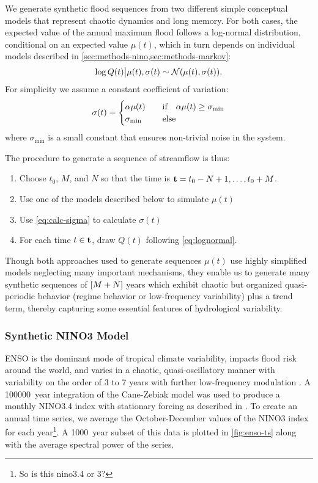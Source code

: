 \documentclass[12pt]{article}
\begin{document}
We generate synthetic flood sequences from two different simple conceptual models that represent chaotic dynamics and long memory.
For both cases, the expected value of the annual maximum flood follows a log-normal distribution, conditional on an expected value $\mu(t)$, which in turn depends on individual models described in \cref{sec:methods-nino,sec:methods-markov}:
\begin{equation} \label{eq:lognormal}
  \log Q(t) \big| \mu(t),\sigma(t) \sim \mathcal{N} \qty(\mu(t), \sigma(t)).
\end{equation}
For simplicity we assume a constant coefficient of variation:
\begin{equation}\label{eq:calc-sigma}
  \sigma(t) = 
  \begin{cases} 
    \alpha \mu(t) & \qqtext{if} \alpha \mu(t) \geq \sigma_\text{min} \\ 
    \sigma_\text{min} & \qqtext{else}
  \end{cases}
\end{equation}
where $\sigma_\text{min}$ is a small constant that ensures non-trivial noise in the system.

The procedure to generate a sequence of streamflow is thus:
\begin{enumerate}
  \item Choose $t_0$, $M$, and $N$ so that the time is $\vb{t}=t_0-N+1, \ldots, t_0+M$.
  \item Use one of the models described below to simulate $\mu(t)$
  \item Use \cref{eq:calc-sigma} to calculate $\sigma(t)$
  \item For each time $t \in \vb{t}$, draw $Q(t)$ following \cref{eq:lognormal}.
\end{enumerate}
Though both approaches used to generate sequences $\mu(t)$ use highly simplified models neglecting many important mechanisms, they enable us to generate many synthetic sequences of $\qty[M + N]$ years which exhibit chaotic but organized quasi-periodic behavior (regime behavior or low-frequency variability) plus a trend term, thereby capturing some essential features of hydrological variability.

\subsubsection{Synthetic NINO3 Model\label{sec:methods-nino}}

ENSO is the dominant mode of tropical climate variability, impacts flood risk around the world, and varies in a chaotic, quasi-oscillatory manner with variability on the order of 3 to 7 years with further low-frequency modulation \citep{Sarachik2010}.
A \SI{100000}{year} integration of the Cane-Zebiak model \citep{Zebiak1987} was used to produce a monthly NINO3.4 index with stationary forcing as described in \citet{Ramesh2017}.
To create an annual time series, we average the October-December values of the NINO3 index for each year\footnote{So is this nino3.4 or 3?}.
A \SI{1000}{year} subset of this data is plotted in \cref{fig:enso-ts} along with the average spectral power of the series.
\end{document}
